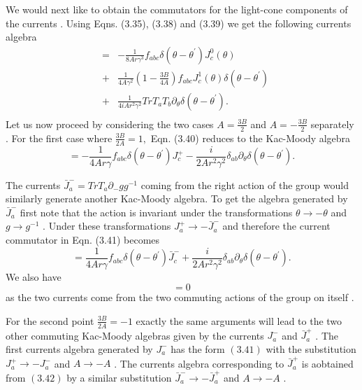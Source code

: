 \documentclass[a4paper,12pt]{article}
\begin{document}
We would next like to obtain the  commutators for the light-cone
components of the currents . Using Eqns. 
(3.35), (3.38) and (3.39) we get the following currents algebra
\begin{eqnarray}
[ J^{+}_a(\theta) , J^{+}_b({\theta}^{'}) ]&=&-\frac{1}{8Ar{\gamma}^3} f_{abc} 
{\delta}({\theta} -{\theta}^{'}) J^{0}_c(\theta)\nonumber\\
&+& \frac{1}{4A{\gamma}^2} (1 -
\frac{3B}{4A}) f_{abc}J_{c}^{1}(\theta)
{\delta}(\theta-{\theta}^{'})\nonumber\\
&+&\frac{1}{4iAr^2{\gamma}^2}TrT_aT_b 
{\partial}_{\theta}{\delta}({\theta} -{\theta}^{'}).\nonumber\\
\end{eqnarray}
Let us now proceed by  considering the two cases 
$A={\frac{3B}{2}}$ and $A=-{\frac{3B}{2}}$ separately .
For the first case where $ \frac{3B}{2A}=1, $ Eqn. (3.40)
reduces to the Kac-Moody algebra 
\begin{equation}
[ J^{+}_a(\theta) , J^{+}_b({\theta}^{'}) ]=-\frac{1}{4Ar{\gamma}} f_{abc} 
{\delta}({\theta} -{\theta}^{'}) J^{+}_{c} 
- \frac{i}{2Ar^2{\gamma}^2}{\delta}_{ab}{\partial}_{\theta}{\delta}({\theta} 
-{\theta}^{'}) .
\end{equation}

The currents ${\bar{J}}^{-}_{a}=TrT_a{\partial}_{-}g g^{-1} $ 
coming from the right action of the group would similarly generate another
Kac-Moody algebra. To get the
 algebra generated by  ${\bar{J}}^{-}_{a}$ first note 
that the action is invariant under
 the transformations  
${\theta}{\longrightarrow}-{\theta}$ and 
$ g{\longrightarrow}g^{-1} $ . 
Under these transformations $J^{+}_a{\longrightarrow}-\bar{J}^{-}_a$ 
and therefore the current commutator in   Eqn. (3.41) becomes
\begin{equation}
[ {\bar{J}}^{-}_a(\theta) , {\bar{J}}^{-}_b({\theta}^{'}) ]=
\frac{1}{4Ar{\gamma}} f_{abc} {\delta}({\theta} 
-{\theta}^{'}) {\bar{J}}^{-}_{c} +\frac{i}{2Ar^2{\gamma}^2}
{\delta}_{ab}{\partial}_{\theta}{\delta}({\theta} -{\theta}^{'}) .
\end{equation} 
We also have 
\begin{equation}
[J^{+}_{a}(\theta),{\bar{J}}^{-}_{b}({\theta}^{'})]=0
\end{equation}
as the two currents come from the two commuting 
actions of the group on itself .

For the second point $\frac{3B}{2A}=-1$ 
exactly the same arguments will 
lead to the two other commuting 
Kac-Moody algebras given by the currents
 $J_{a}^{-}$ and $\bar{J}_{a}^{+}$ . The first
 currents algebra generated by $J_a^{-}$ has the form $(3.41)$ with
 the substitution $J_{a}^{+}{\longrightarrow}-J_{a}^{-}$ and 
$A{\longrightarrow}-A$ . The currents algebra corresponding
 to $\bar{J}_{a}^{+}$ is aobtained from $(3.42)$ by
 a similar substitution $\bar{J}_{a}^{-}{\longrightarrow}-\bar{J}_{a}^{+}$ 
and $A{\longrightarrow}-A$ .
\end{document}
